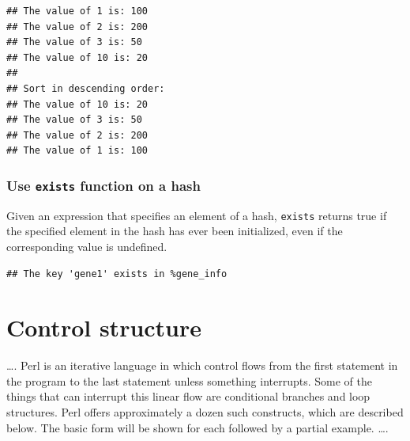 \documentclass[]{book}
\makeatletter
\newenvironment{Shaded}{\begin{snugshade}}{\end{snugshade}}
\newcommand{\CharTok}[1]{\textcolor[rgb]{0.31,0.60,0.02}{#1}}
\newcommand{\DataTypeTok}[1]{\textcolor[rgb]{0.13,0.29,0.53}{#1}}
\newcommand{\FunctionTok}[1]{\textcolor[rgb]{0.00,0.00,0.00}{#1}}
\newcommand{\KeywordTok}[1]{\textcolor[rgb]{0.13,0.29,0.53}{\textbf{#1}}}
\newcommand{\NormalTok}[1]{#1}
\newcommand{\StringTok}[1]{\textcolor[rgb]{0.31,0.60,0.02}{#1}}
\newenvironment{kframe}{%
\medskip{}
\setlength{\fboxsep}{.8em}
 \def\at@end@of@kframe{}%
 \ifinner\ifhmode%
  \def\at@end@of@kframe{\end{minipage}}%
  \begin{minipage}{\columnwidth}%
 \fi\fi%
 \def\FrameCommand##1{\hskip\@totalleftmargin \hskip-\fboxsep
 \colorbox{shadecolor}{##1}\hskip-\fboxsep
     \hskip-\linewidth \hskip-\@totalleftmargin \hskip\columnwidth}%
 \MakeFramed {\advance\hsize-\width
   \@totalleftmargin\z@ \linewidth\hsize
   \@setminipage}}%
 {\par\unskip\endMakeFramed%
 \at@end@of@kframe}
\renewenvironment{Shaded}{\begin{kframe}}{\end{kframe}}
\makeatother
\begin{document}
\begin{verbatim}
## The value of 1 is: 100
## The value of 2 is: 200
## The value of 3 is: 50
## The value of 10 is: 20
## 
## Sort in descending order: 
## The value of 10 is: 20
## The value of 3 is: 50
## The value of 2 is: 200
## The value of 1 is: 100
\end{verbatim}

\hypertarget{use-exists-function-on-a-hash}{%
\subsection{\texorpdfstring{Use \texttt{exists} function on a hash}{Use exists function on a hash}}\label{use-exists-function-on-a-hash}}

Given an expression that specifies an element of a hash, \texttt{exists} returns true if the specified element in the hash has ever been initialized, even if the corresponding value is undefined.

\begin{Shaded}
\end{Shaded}

\begin{verbatim}
## The key 'gene1' exists in %gene_info
\end{verbatim}

\hypertarget{control-structure}{%
\chapter{Control structure}\label{control-structure}}

\ldots{}.
Perl is an iterative language in which control flows from the first statement in the program to the last statement unless something interrupts. Some of the things that can interrupt this linear flow are conditional branches and loop structures. Perl offers approximately a dozen such constructs, which are described below. The basic form will be shown for each followed by a partial example.
\ldots{}.
\end{document}
